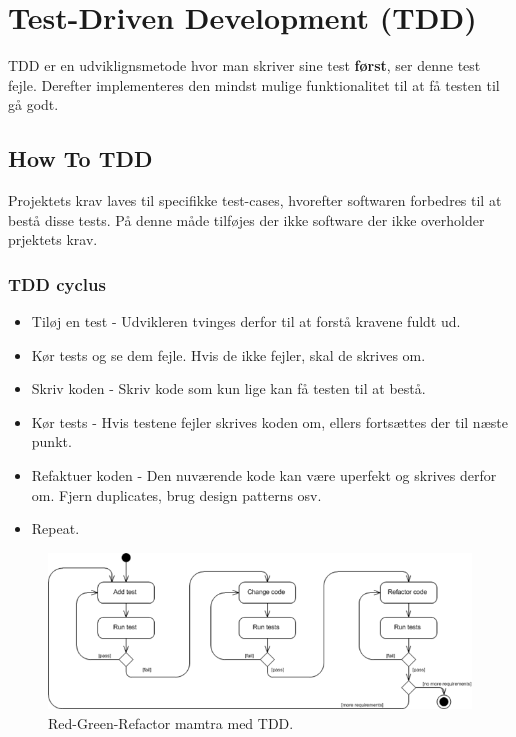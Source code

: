 \section{Test-Driven Development (TDD)}

TDD er en udviklignsmetode hvor man skriver sine test \textbf{først}, ser denne test fejle. Derefter implementeres den mindst mulige funktionalitet til at få testen til gå godt.

\subsection{How To TDD}
Projektets krav laves til specifikke test-cases, hvorefter softwaren forbedres til at bestå disse tests. På denne måde tilføjes der ikke software der ikke overholder prjektets krav.

\subsubsection{TDD cyclus}
\begin{itemize}
	\item Tiløj en test - Udvikleren tvinges derfor til at forstå kravene fuldt ud.
	\item Kør tests og se dem fejle. Hvis de ikke fejler, skal de skrives om.
	\item Skriv koden - Skriv kode som kun lige kan få testen til at bestå.
	\item Kør tests - Hvis testene fejler skrives koden om, ellers fortsættes der til næste punkt.
	\item Refaktuer koden - Den nuværende kode kan være uperfekt og skrives derfor om. Fjern duplicates, brug design patterns osv.
	\item Repeat.
\end{itemize}

\begin{figure}[h]
\centering
\includegraphics[width=\linewidth]{figs/tdd}
\caption{Red-Green-Refactor mamtra med TDD.}
\label{fig:tdd}
\end{figure}

